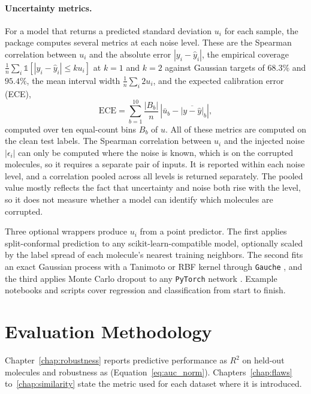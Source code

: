 \paragraph{Uncertainty metrics.} For a model that returns a predicted standard deviation
$u_i$ for each sample, the package computes several metrics at each noise level. These are the Spearman correlation between $u_i$ and the
absolute error $|y_i - \hat{y}_i|$, the empirical coverage $\frac{1}{n}\sum_i \mathbb{1}\left[|y_i -
\hat{y}_i| \le k u_i\right]$ at $k = 1$ and $k = 2$ against Gaussian targets of $68.3\%$ and
$95.4\%$, the mean interval width $\frac{1}{n}\sum_i 2u_i$, and the expected calibration error (ECE),
\begin{equation}
\mathrm{ECE} = \sum_{b=1}^{10} \frac{|B_b|}{n}\,\left|\bar{u}_b - \overline{|y - \hat{y}|}_b\right|,
\label{eq:ece}
\end{equation}
computed over ten equal-count bins $B_b$ of $u$. All of these metrics are computed on the clean test labels. The Spearman
correlation between $u_i$ and the injected noise $|\epsilon_i|$ can only be computed where the noise
is known, which is on the corrupted molecules, so it requires a separate pair of inputs. It is reported
within each noise level, and a correlation pooled across all levels is returned separately. The pooled value
mostly reflects the fact that uncertainty and noise both rise with the level, so it
does not measure whether a model can identify which molecules are corrupted.

Three optional wrappers produce $u_i$ from a point predictor. The first applies split-conformal prediction to any
scikit-learn-compatible model, optionally scaled by the label spread of each molecule's nearest
training neighbors. The second fits an exact Gaussian process with a Tanimoto or RBF kernel through \texttt{Gauche}
\citep{gauche}, and the third applies Monte Carlo dropout to any \texttt{PyTorch} network \citep{gal2016}. Example
notebooks and scripts cover regression and classification from start to finish.


\section{Evaluation Methodology}

Chapter~\ref{chap:robustness} reports predictive performance as $R^2$ on held-out molecules and robustness as \aucnorm{} (Equation~\ref{eq:auc_norm}). Chapters~\ref{chap:flaws} to~\ref{chap:similarity} state the metric used for each dataset where it is introduced.

